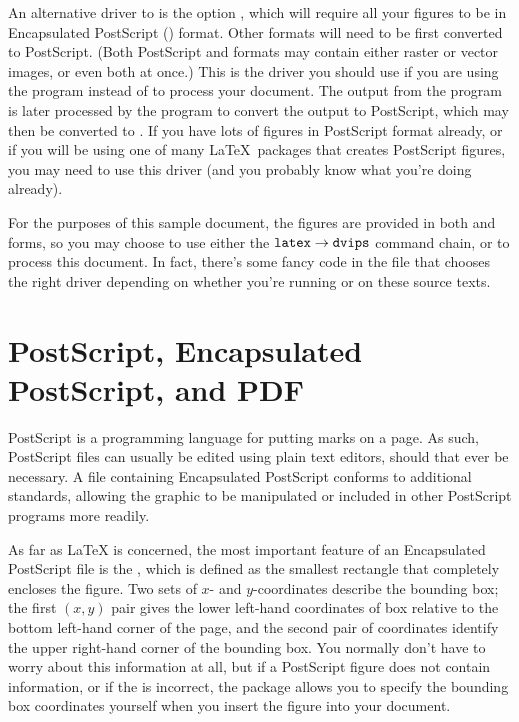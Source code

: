 An alternative driver to  is the option , which
will require all your figures to be in Encapsulated PostScript
() format.  Other formats will need to be first converted to
PostScript.  (Both PostScript and  formats may contain
either raster or vector images, or even both at once.)  This is the
driver you should use if you are using the program  instead
of  to process your document.  The  output
from the  program is later processed by the 
program to convert the output to PostScript, which may then be
converted to .  If you have lots of figures in PostScript
format already, or if you will be using one of many \LaTeX\ packages
that creates PostScript figures, you may need to use this driver (and
you probably know what you're doing already).

For the purposes of this sample document, the figures are provided in
both  and  forms, so you may choose to use either
the $\mbox{\texttt{latex}}\rightarrow\mbox{\texttt{dvips}}$ command chain,
or  to process this document. In fact, there's some
fancy code in the  file that chooses the right driver
depending on whether you're running  or  on
these source texts.

\section{PostScript, Encapsulated PostScript, and PDF}
PostScript is a programming language for putting marks on a page.  As
such, PostScript files can usually be edited using plain text editors,
should that ever be necessary.  A file containing Encapsulated
PostScript conforms to additional standards, allowing the graphic to
be manipulated or included in other PostScript programs more readily.

As far as \LaTeX{} is concerned, the most important feature of an
Encapsulated PostScript file is the , which is
defined as the smallest rectangle that completely encloses the figure.
Two sets of $x$- and $y$-coordinates describe the bounding box; the
first $(x,y)$ pair gives the lower left-hand coordinates of box
relative to the bottom left-hand corner of the page, and the second
pair of coordinates identify the upper right-hand corner of the
bounding box.  You normally don't have to worry about this information
at all, but if a PostScript figure does not contain
 information, or if the  is
incorrect, the  package allows you to specify the
bounding box coordinates yourself when you insert the figure into your
document.

